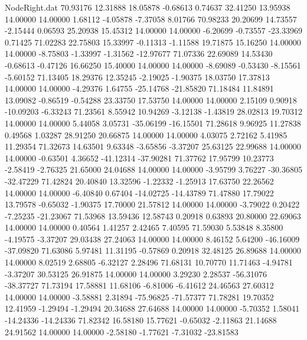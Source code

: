 \begin{filecontents}{NodeRight.dat}
  70.93176   12.31888   18.05878    -0.68613    0.74637   32.41250   13.95938   14.00000   14.00000    1.68112   -4.05878   -7.37058    8.01766
  70.98233   20.20699   14.73557    -2.15444    0.06593   25.20938   15.45312   14.00000   14.00000   -6.20699   -0.73557  -23.33969    0.71425
  71.02283   22.75803   15.33997    -0.11313   -1.11588   19.71875   15.16250   14.00000   14.00000   -8.75803   -1.33997   -1.31562  -12.97677
  71.07336   22.69089   14.53430    -0.68613   -0.47126   16.66250   15.40000   14.00000   14.00000   -8.69089   -0.53430   -8.15561   -5.60152
  71.13405   18.29376   12.35245    -2.19025   -1.90375   18.03750   17.37813   14.00000   14.00000   -4.29376    1.64755  -25.14768  -21.85820
  71.18484   11.84891   13.09082    -0.86519   -0.54288   23.33750   17.53750   14.00000   14.00000    2.15109    0.90918  -10.09203   -6.33243
  71.23561    8.55942   10.94269    -3.12138   -1.43819   28.02813   19.70312   14.00000   14.00000    5.44058    3.05731  -35.06199  -16.15501
  71.28618    9.96925   11.27838     0.49568    1.03287   28.91250   20.66875   14.00000   14.00000    4.03075    2.72162    5.41985   11.29354
  71.32673   14.63501    9.63348    -3.65856   -3.37207   25.63125   22.99688   14.00000   14.00000   -0.63501    4.36652  -41.12314  -37.90281
  71.37762   17.95799   10.23773    -2.58419   -2.76325   21.65000   24.04688   14.00000   14.00000   -3.95799    3.76227  -30.36805  -32.47229
  71.42824   20.40840   13.32596    -1.22332   -1.25913   17.63750   22.26562   14.00000   14.00000   -6.40840    0.67404  -14.02725  -14.43789
  71.47880   17.79022   13.79578    -0.65032   -1.90375   17.70000   21.57812   14.00000   14.00000   -3.79022    0.20422   -7.25235  -21.23067
  71.53968   13.59436   12.58743     0.20918    0.63893   20.80000   22.69063   14.00000   14.00000    0.40564    1.41257    2.42465    7.40595
  71.59030    5.53848    8.35800    -4.19575   -3.37207   29.03438   27.24063   14.00000   14.00000    8.46152    5.64200  -46.16009  -37.09820
  71.63086    5.97481   11.31195    -0.57869    0.20918   32.48125   26.89688   14.00000   14.00000    8.02519    2.68805   -6.32127    2.28496
  71.68131   10.70770   11.71463    -4.94781   -3.37207   30.53125   26.91875   14.00000   14.00000    3.29230    2.28537  -56.31076  -38.37727
  71.73194   17.58881   11.68106    -6.81006   -6.41612   24.46563   27.60312   14.00000   14.00000   -3.58881    2.31894  -75.96825  -71.57377
  71.78281   19.70352   12.41959    -1.29494   -1.29494   20.34688   27.64688   14.00000   14.00000   -5.70352    1.58041  -14.24336  -14.24336
  71.82342   16.58180   15.77621    -0.65032   -2.11863   21.14688   24.91562   14.00000   14.00000   -2.58180   -1.77621   -7.31032  -23.81583

\end{filecontents}
